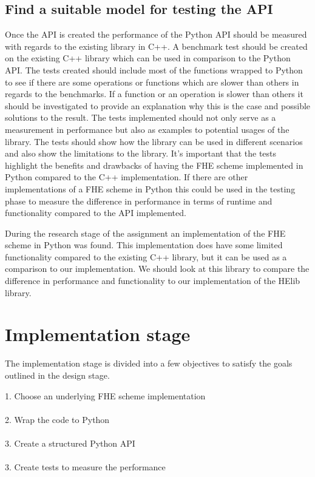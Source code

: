 \subsection{Find a suitable model for testing the API}
Once the API is created the performance of the Python API should be measured with regards to the existing library in C++. A benchmark test should be created on the existing C++ library which can be used in comparison to the Python API. The tests created should include most of the functions wrapped to Python to see if there are some operations or functions which are slower than others in regards to the benchmarks. If a function or an operation is slower than others it should be investigated to provide an explanation why this is the case and possible solutions to the result. The tests implemented should not only serve as a measurement in performance but also as examples to potential usages of the library. The tests should show how the library can be used in different scenarios and also show the limitations to the library. It's important that the tests highlight the benefits and drawbacks of having the FHE scheme implemented in Python compared to the C++ implementation. If there are other implementations of a FHE scheme in Python this could be used in the testing phase to measure the difference in performance in terms of runtime and functionality compared to the API implemented.

During the research stage of the assignment an implementation of the FHE scheme in Python was found. This implementation does have some limited functionality compared to the existing C++ library, but it can be used as a comparison to our implementation. We should look at this library to compare the difference in performance and functionality to our implementation of the HElib library.

\newpage
\section{Implementation stage}
The implementation stage is divided into a few objectives to satisfy the goals outlined in the design stage.


1. Choose an underlying FHE scheme implementation\\\\
2. Wrap the code to Python\\\\
3. Create a structured Python API \\\\
3. Create tests to measure the performance \\\\

